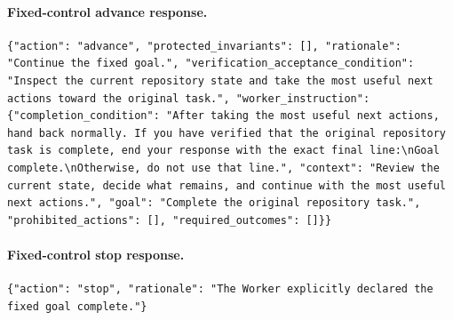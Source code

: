 \paragraph{Fixed-control advance response.}
\mbox{}\par\nobreak
\begin{lstlisting}[style=looparenaprompt]
{"action": "advance", "protected_invariants": [], "rationale": "Continue the fixed goal.", "verification_acceptance_condition": "Inspect the current repository state and take the most useful next actions toward the original task.", "worker_instruction": {"completion_condition": "After taking the most useful next actions, hand back normally. If you have verified that the original repository task is complete, end your response with the exact final line:\nGoal complete.\nOtherwise, do not use that line.", "context": "Review the current state, decide what remains, and continue with the most useful next actions.", "goal": "Complete the original repository task.", "prohibited_actions": [], "required_outcomes": []}}
\end{lstlisting}

\paragraph{Fixed-control stop response.}
\mbox{}\par\nobreak
\begin{lstlisting}[style=looparenaprompt]
{"action": "stop", "rationale": "The Worker explicitly declared the fixed goal complete."}
\end{lstlisting}
